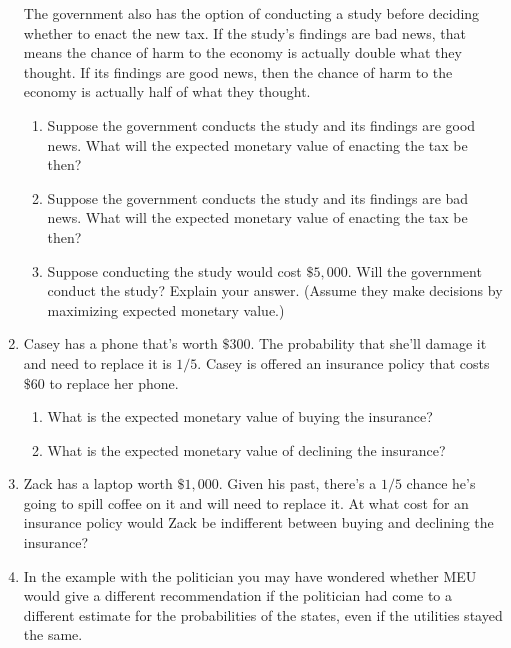 \documentclass[]{tufte-book}
\providecommand{\tightlist}{%
  \setlength{\itemsep}{0pt}\setlength{\parskip}{0pt}}
\begin{document}
\begin{enumerate}
  The government also has the option of conducting a study before deciding whether to enact the new tax. If the study's findings are bad news, that means the chance of harm to the economy is actually double what they thought. If its findings are good news, then the chance of harm to the economy is actually half of what they thought.

  \begin{enumerate}
  \def\labelenumii{\alph{enumii}.}
  \setcounter{enumii}{1}
  \tightlist
  \item
    Suppose the government conducts the study and its findings are good news. What will the expected monetary value of enacting the tax be then?
  \item
    Suppose the government conducts the study and its findings are bad news. What will the expected monetary value of enacting the tax be then?
  \item
    Suppose conducting the study would cost \(\$5,000\). Will the government conduct the study? Explain your answer. (Assume they make decisions by maximizing expected monetary value.)
  \end{enumerate}
\item
  Casey has a phone that's worth \(\$300\). The probability that she'll damage it and need to replace it is \(1/5\). Casey is offered an insurance policy that costs \(\$60\) to replace her phone.

  \begin{enumerate}
  \def\labelenumii{\alph{enumii}.}
  \tightlist
  \item
    What is the expected monetary value of buying the insurance?
  \item
    What is the expected monetary value of declining the insurance?
  \end{enumerate}
\item
  Zack has a laptop worth \(\$1,000\). Given his past, there's a \(1/5\) chance he's going to spill coffee on it and will need to replace it. At what cost for an insurance policy would Zack be indifferent between buying and declining the insurance?
\item
  In the example with the politician you may have wondered whether MEU would give a different recommendation if the politician had come to a different estimate for the probabilities of the states, even if the utilities stayed the same.


\end{enumerate}
\end{document}
